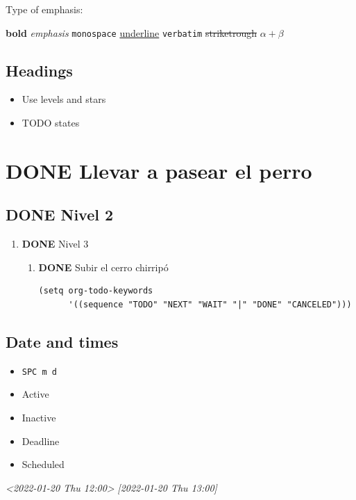 \documentclass[11pt]{article}
\begin{document}
Type of emphasis:

\textbf{bold}
\emph{emphasis}
\texttt{monospace}
\uline{underline}
\texttt{verbatim}
\sout{striketrough}
\(\alpha + \beta\)


\subsection{Headings}
\label{sec:org69b5823}
\begin{itemize}
\item Use levels and stars
\item TODO states
\end{itemize}

\section{{\bfseries\sffamily DONE} Llevar a pasear el perro}
\label{sec:org21a71d1}
\subsection{{\bfseries\sffamily DONE} Nivel 2}
\label{sec:org93bb9aa}
\begin{enumerate}
\item {\bfseries\sffamily DONE} Nivel 3
\label{sec:org03eecde}
\begin{enumerate}
\item {\bfseries\sffamily DONE} Subir el cerro chirripó
\label{sec:org9c8f37d}

\begin{verbatim}
(setq org-todo-keywords
      '((sequence "TODO" "NEXT" "WAIT" "|" "DONE" "CANCELED")))
\end{verbatim}
\end{enumerate}
\end{enumerate}

\subsection{Date and times}
\label{sec:org80e087b}
\begin{itemize}
\item \texttt{SPC m d}
\item Active
\item Inactive
\item Deadline
\item Scheduled
\end{itemize}

\textit{<2022-01-20 Thu 12:00>}
\textit{[2022-01-20 Thu 13:00]}
\end{document}
